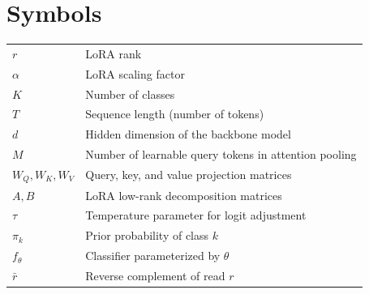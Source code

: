 \section*{Symbols}

\begin{longtable}{ll}
    $r$         & LoRA rank \\
    $\alpha$    & LoRA scaling factor \\
    $K$         & Number of classes \\
    $T$         & Sequence length (number of tokens) \\
    $d$         & Hidden dimension of the backbone model \\
    $M$         & Number of learnable query tokens in attention pooling \\
    $W_Q, W_K, W_V$ & Query, key, and value projection matrices \\
    $A, B$      & LoRA low-rank decomposition matrices \\
    $\tau$      & Temperature parameter for logit adjustment \\
    $\pi_k$     & Prior probability of class $k$ \\
    $f_\theta$  & Classifier parameterized by $\theta$ \\
    $\bar{r}$   & Reverse complement of read $r$ \\
\end{longtable}
